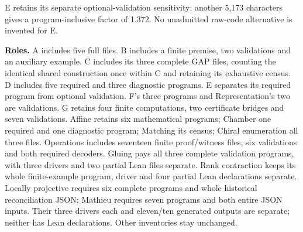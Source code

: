 \documentclass[11pt,a4paper]{article}
\begin{document}
E retains its separate optional-validation sensitivity: another 5,173 characters gives a program-inclusive factor of 1.372. No unadmitted raw-code alternative is invented for E.

\textbf{Roles.} A includes five full files. B includes a finite premise, two validations and an auxiliary example. C includes its three complete GAP files, counting the identical shared construction once within C and retaining its exhaustive census. D includes five required and three diagnostic programs. E separates its required program from optional validation. F's three programs and Representation's two are validations. G retains four finite computations, two certificate bridges and seven validations. Affine retains six mathematical programs; Chamber one required and one diagnostic program; Matching its census; Chiral enumeration all three files. Operations includes seventeen finite proof/witness files, six validations and both required decoders. Gluing pays all three complete validation programs, with three drivers and two partial Lean files separate. Rank contraction keeps its whole finite-example program, driver and four partial Lean declarations separate. Locally projective requires six complete programs and whole historical reconciliation JSON; Mathieu requires seven programs and both entire JSON inputs. Their three drivers each and eleven/ten generated outputs are separate; neither has Lean declarations. Other inventories stay unchanged.
\end{document}
